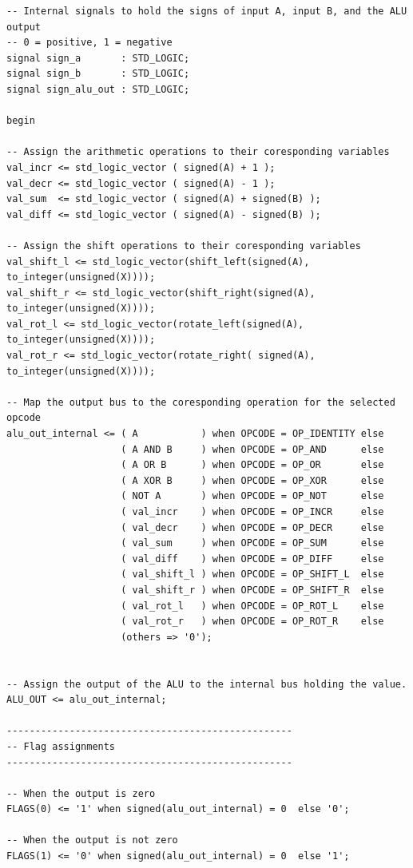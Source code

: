 \documentclass[10pt]{article}
\begin{document}
\begin{verbatim}
-- Internal signals to hold the signs of input A, input B, and the ALU output
-- 0 = positive, 1 = negative
signal sign_a       : STD_LOGIC;
signal sign_b       : STD_LOGIC;
signal sign_alu_out : STD_LOGIC;

begin

-- Assign the arithmetic operations to their coresponding variables
val_incr <= std_logic_vector ( signed(A) + 1 );
val_decr <= std_logic_vector ( signed(A) - 1 );
val_sum  <= std_logic_vector ( signed(A) + signed(B) );
val_diff <= std_logic_vector ( signed(A) - signed(B) );

-- Assign the shift operations to their coresponding variables
val_shift_l <= std_logic_vector(shift_left(signed(A), to_integer(unsigned(X))));
val_shift_r <= std_logic_vector(shift_right(signed(A), to_integer(unsigned(X))));
val_rot_l <= std_logic_vector(rotate_left(signed(A), to_integer(unsigned(X))));
val_rot_r <= std_logic_vector(rotate_right( signed(A), to_integer(unsigned(X))));

-- Map the output bus to the coresponding operation for the selected opcode
alu_out_internal <= ( A           ) when OPCODE = OP_IDENTITY else
                    ( A AND B     ) when OPCODE = OP_AND      else
                    ( A OR B      ) when OPCODE = OP_OR       else
                    ( A XOR B     ) when OPCODE = OP_XOR      else
                    ( NOT A       ) when OPCODE = OP_NOT      else
                    ( val_incr    ) when OPCODE = OP_INCR     else
                    ( val_decr    ) when OPCODE = OP_DECR     else
                    ( val_sum     ) when OPCODE = OP_SUM      else
                    ( val_diff    ) when OPCODE = OP_DIFF     else
                    ( val_shift_l ) when OPCODE = OP_SHIFT_L  else
                    ( val_shift_r ) when OPCODE = OP_SHIFT_R  else
                    ( val_rot_l   ) when OPCODE = OP_ROT_L    else
                    ( val_rot_r   ) when OPCODE = OP_ROT_R    else
                    (others => '0'); 


-- Assign the output of the ALU to the internal bus holding the value.
ALU_OUT <= alu_out_internal;

--------------------------------------------------
-- Flag assignments
--------------------------------------------------

-- When the output is zero
FLAGS(0) <= '1' when signed(alu_out_internal) = 0  else '0';

-- When the output is not zero
FLAGS(1) <= '0' when signed(alu_out_internal) = 0  else '1';


\end{verbatim}
\end{document}
